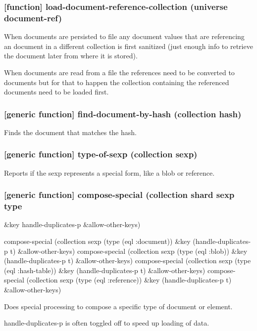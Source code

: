 \documentclass[11pt]{article}
\begin{document}
\subsubsection{[function] load-document-reference-collection (universe document-ref)}
\label{sec:org641c567}

When documents are persisted to file any document values that are
referencing an document in a different collection is first sanitized
(just enough info to retrieve the document later from where it is
stored).

When documents are read from a file the references need to be
converted to documents but for that to happen the collection
containing the referenced documents need to be loaded first.

\subsubsection{[generic function] find-document-by-hash (collection hash)}
\label{sec:org95fccde}

Finds the document that matches the hash.

\subsubsection{[generic function] type-of-sexp (collection sexp)}
\label{sec:org1fdf17c}

Reports if the sexp represents a special form, like a blob or reference.

\subsubsection{[generic function] compose-special (collection shard sexp type}
\label{sec:org2084977}
\&key handle-duplicates-p \&allow-other-keys)

compose-special (collection sexp (type (eql :document)) \&key (handle-duplicates-p t) \&allow-other-keys)
compose-special (collection sexp (type (eql :blob)) \&key (handle-duplicates-p t) \&allow-other-keys)
compose-special (collection sexp (type (eql :hash-table)) \&key (handle-duplicates-p t) \&allow-other-keys)
compose-special (collection sexp (type (eql :reference)) \&key (handle-duplicates-p t) \&allow-other-keys)

Does special processing to compose a specific type of document or element.

handle-duplicates-p is often toggled off to speed up loading of data.
\end{document}
